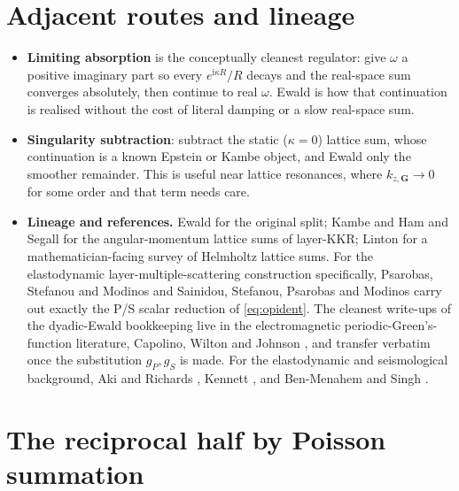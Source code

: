 \documentclass[11pt,a4paper]{article}
\newcommand{\ii}{\mathrm{i}}
\newcommand{\vG}{\mathbf{G}}
\newcommand{\kzG}{k_{z,\vG}}
\begin{document}
\section{Adjacent routes and lineage}

\begin{itemize}
  \item \textbf{Limiting absorption} is the conceptually cleanest regulator: give $\omega$ a
  positive imaginary part so every $e^{\ii\kappa R}/R$ decays and the real-space sum converges
  absolutely, then continue to real $\omega$. Ewald is how that continuation is realised
  without the cost of literal damping or a slow real-space sum.
  \item \textbf{Singularity subtraction}: subtract the static ($\kappa=0$) lattice sum, whose
  continuation is a known Epstein or Kambe object, and Ewald only the smoother remainder.
  This is useful near lattice resonances, where $\kzG\to 0$ for some order and that term needs
  care.
  \item \textbf{Lineage and references.} Ewald \cite{Ewald1921} for the original split; Kambe
  \cite{Kambe1968} and Ham and Segall \cite{HamSegall1961} for the angular-momentum lattice
  sums of layer-KKR; Linton \cite{Linton2010} for a mathematician-facing survey of Helmholtz
  lattice sums. For the elastodynamic layer-multiple-scattering construction specifically,
  Psarobas, Stefanou and Modinos \cite{Psarobas2000} and Sainidou, Stefanou, Psarobas and
  Modinos \cite{Sainidou2005} carry out exactly the P/S scalar reduction of
  \eqref{eq:opident}. The cleanest write-ups of the dyadic-Ewald bookkeeping live in the
  electromagnetic periodic-Green's-function literature, Capolino, Wilton and Johnson
  \cite{Capolino2007}, and transfer verbatim once the substitution $g_P,g_S$ is made. For the
  elastodynamic and seismological background, Aki and Richards \cite{AkiRichards},
  Kennett \cite{Kennett}, and Ben-Menahem and Singh \cite{BenMenahem}.
\end{itemize}

\appendix
\section{The reciprocal half by Poisson summation}
\end{document}
